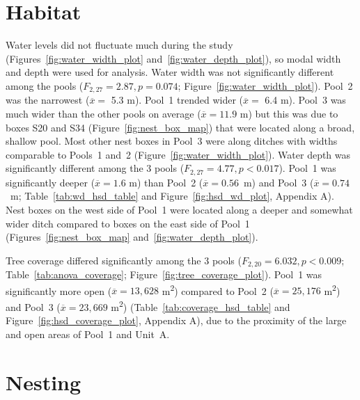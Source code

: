 
\section*{Habitat}

Water levels did not fluctuate much during the study (Figures~\ref{fig:water_width_plot} and~\ref{fig:water_depth_plot}), so  modal width and depth were used for analysis.  Water width was not significantly different among the pools ($F_{2,27} = 2.87, p = 0.074$; Figure~\ref{fig:water_width_plot}). Pool~2 was the narrowest ($\overline{x} =$ \num{5.3} \unit{\meter}). Pool~1 trended wider ($\overline{x} =$ 6.4 m). Pool~3 was much wider than the other  pools on average ($\overline{x} = 11.9$ \unit{\meter}) but this was due to boxes S20 and S34 (Figure~\ref{fig:nest_box_map}) that were located along a broad, shallow pool. Most other nest boxes in Pool~3 were along ditches with widths comparable to Pools~1 and~2  (Figure~\ref{fig:water_width_plot}). Water depth was significantly different among the 3 pools ($F_{2,27} = 4.77, p < 0.017$). Pool~1 was significantly deeper ($\overline{x} = 1.6$ \unit{\meter}) than Pool~2 ($\overline{x} = 0.56$~\unit{\meter}) and Pool~3 ($\overline{x} = 0.74$~\unit{\meter};  Table~\ref{tab:wd_hsd_table} and Figure~\ref{fig:hsd_wd_plot}, Appendix A). Nest boxes on the west side of Pool~1 were located along a deeper and somewhat wider ditch compared to boxes on the east side of Pool~1 (Figures~\ref{fig:nest_box_map} and~\ref{fig:water_depth_plot}).  





Tree coverage differed significantly among the 3 pools ($F_{2,20} = 6.032, p < 0.009$; Table~\ref{tab:anova_coverage}; Figure~\ref{fig:tree_coverage_plot}). Pool~1 was significantly more open ($\overline{x} = 13{,}628$ \unit{\meter\squared}) compared to Pool~2 ($\overline{x} = 25{,}176$ \unit{\meter\squared}) and Pool~3 ($\overline{x} = 23{,}669$ \unit{\meter\squared}) (Table~\ref{tab:coverage_hsd_table} and Figure~\ref{fig:hsd_coverage_plot}, Appendix A), due to the proximity of the large and open areas of Pool~1 and Unit~A. 





\section*{Nesting}

